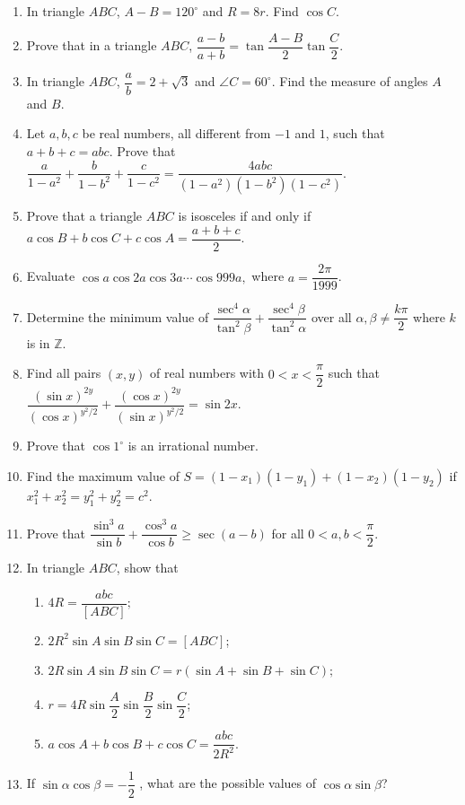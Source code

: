 \documentclass[12pt]{scrartcl}
\begin{document}
\begin{enumerate}
    \item In triangle $ABC$, $A-B=120^{\circ}$ and $R=8r$. Find $\cos C$.
    \item Prove that in a triangle $ABC$, $\dfrac{a-b}{a+b}=\tan\dfrac{A-B}{2}\tan\dfrac{C}{2}.$
    \item In triangle $ABC$, $\dfrac{a}{b}=2+\sqrt{3}$ and $\angle C=60^{\circ}$. Find the measure of angles $A$ and $B$.
    \item Let $a, b, c$ be real numbers, all different from $-1$ and $1$, such that $a+b+c= abc$. Prove that $\dfrac{a}{1-a^{2}}+\dfrac{b}{1-b^{2}}+\dfrac{c}{1-c^{2}}=\dfrac{4abc}{(1-a^{2})(1-b^{2})(1-c^{2})}.$
    \item Prove that a triangle $ABC$ is isosceles if and only if $a \cos B+b \cos C+c \cos A=\dfrac{a+b+c}{2}.$
    \item Evaluate $\cos a \cos 2a \cos 3a\cdots \cos 999a,$ where $a=\dfrac{2\pi}{1999}$.
    \item Determine the minimum value of $\dfrac{\sec^{4}\alpha}{\tan^{2}\beta}+\dfrac{\sec^{4}\beta}{\tan^{2}\alpha}$ over all $\alpha, \beta\ne\dfrac{k\pi}{2}$ where $k$ is in $\mathbb{Z}$.
    \item Find all pairs $(x, y)$ of real numbers with $0<x<\dfrac{\pi}{2}$ such that $\dfrac{(\sin x)^{2y}}{(\cos x)^{y^{2}/2}}+\dfrac{(\cos x)^{2y}}{(\sin x)^{y^{2}/2}}=\sin 2x.$
    \item Prove that $\cos 1^{\circ}$ is an irrational number.
    \item Find the maximum value of $S=(1-x_{1})(1-y_{1})+(1-x_{2})(1-y_{2})$ if $x_{1}^{2}+x_{2}^{2}=y_{1}^{2}+y_{2}^{2}=c^{2}$.
    \item Prove that $\dfrac{\sin^{3}a}{\sin b}+\dfrac{\cos^{3}a}{\cos b}\ge \sec(a-b)$ for all $0<a, b<\dfrac{\pi}{2}$.
    \item In triangle $ABC$, show that 
    \begin{enumerate}
        \item $4R=\dfrac{abc}{[ABC]};$ 
        \item $2R^{2}\sin A \sin B \sin C=[ABC]$; 
        \item $2R \sin A \sin B \sin C=r(\sin A+\sin B+\sin C);$ 
        \item $r=4R \sin\dfrac{A}{2}\sin\dfrac{B}{2}\sin\dfrac{C}{2}$; 
        \item $a \cos A+b \cos B+c \cos C=\dfrac{abc}{2R^{2}}.$
    \end{enumerate}
    \item If $\sin \alpha \cos \beta=-\dfrac{1}{2}$ , what are the possible values of $\cos \alpha \sin \beta$?

\end{enumerate}
\end{document}
